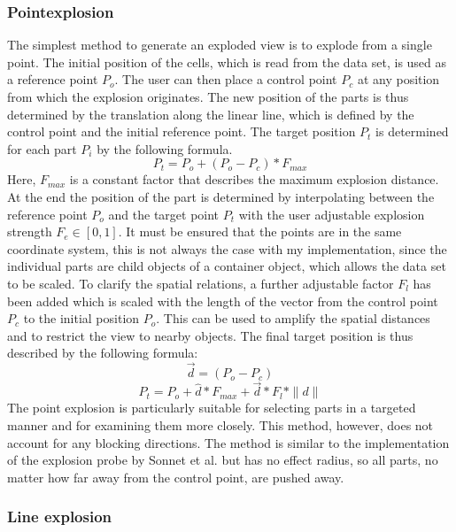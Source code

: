 \subsubsection{Pointexplosion}
The simplest method to generate an exploded view is to explode from a single point.
The initial position of the cells, which is read from the data set, is used as a reference point $P_o$. 
The user can then place a control point $P_c$ at any position from which the explosion originates. 
The new position of the parts is thus determined by the translation along the linear line, which is defined by the control point and the initial reference point.
The target position $P_t$ is determined for each part $P_i$ by the following formula. 
\begin{equation}
	P_t = P_o + (P_o - P_c) * F_{max}
	\label{eq:pointExpl1}
\end{equation}
Here, $F_{max}$ is a constant factor that describes the maximum explosion distance. At the end the position of the part is determined by interpolating between the reference point $P_o$ and the target point $P_t$ with the user adjustable explosion strength $F_e \in [0, 1]$.
It must be ensured that the points are in the same coordinate system, this is not always the case with my implementation, since the individual parts are child objects of a container object, which allows the data set to be scaled.
To clarify the spatial relations, a further adjustable factor $F_l$ has been added which is scaled with the length of the vector from the control point $P_c$ to the initial position $P_o$. This can be used to amplify the spatial distances and to restrict the view to nearby objects.
The final target position is thus described by the following formula:
\begin{equation}
	\vec{d} = (P_o - P_c) 
	\label{eq:pointExpl2}
\end{equation}
\begin{equation} 
	P_t = P_o + \hat{d} * F_{max} + \vec{d} * F_l * \|d\|
	\label{eq:pointExpl3}
\end{equation}
The point explosion is particularly suitable for selecting parts in a targeted manner and for examining them more closely.
This method, however, does not account for any blocking directions.
The method is similar to the implementation of the explosion probe by Sonnet et al.\cite{Sonnet_2004} but has no effect radius, so all parts, no matter how far away from the control point, are pushed away.

\subsubsection{Line explosion}

